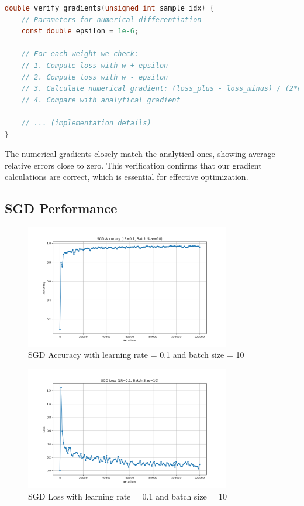 \documentclass{article}
\begin{document}
\begin{lstlisting}[language=C]
double verify_gradients(unsigned int sample_idx) {
    // Parameters for numerical differentiation
    const double epsilon = 1e-6;
    
    // For each weight we check:
    // 1. Compute loss with w + epsilon
    // 2. Compute loss with w - epsilon
    // 3. Calculate numerical gradient: (loss_plus - loss_minus) / (2*epsilon)
    // 4. Compare with analytical gradient
    
    // ... (implementation details)
}
\end{lstlisting}

The numerical gradients closely match the analytical ones, showing average relative errors close to zero. This verification confirms that our gradient calculations are correct, which is essential for effective optimization.

\subsection{SGD Performance}
\begin{figure}[h]
\centering
\includegraphics[width=0.8\textwidth]{plots/part1_sgd_accuracy.png}
\caption{SGD Accuracy with learning rate = 0.1 and batch size = 10}
\end{figure}

\begin{figure}[h]
\centering
\includegraphics[width=0.8\textwidth]{plots/part1_sgd_loss.png}
\caption{SGD Loss with learning rate = 0.1 and batch size = 10}
\end{figure}
\end{document}
